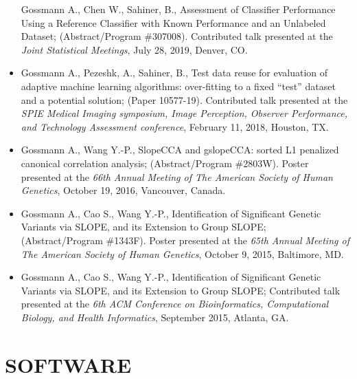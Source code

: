\documentclass[overlapped, line, 10pt]{res} %
\begin{document}
\begin{resume}
\begin{itemize}
    Gossmann A., Chen W., Sahiner, B., Assessment of Classifier Performance Using a Reference Classifier with Known Performance and an Unlabeled Dataset;
    (Abstract/Program \#307008).
    Contributed talk presented at the \textit{Joint Statistical Meetings},
    July 28, 2019, Denver, CO.
  \item
    Gossmann A., Pezeshk, A., Sahiner, B., Test data reuse for evaluation of adaptive machine learning algorithms: over-fitting to a fixed ``test'' dataset and a potential solution;
    (Paper 10577-19).
    Contributed talk presented at the \textit{SPIE Medical Imaging symposium, Image Perception, Observer Performance, and Technology Assessment conference},
    February 11, 2018, Houston, TX.
  \item
    Gossmann A., Wang Y.-P., SlopeCCA and gslopeCCA: sorted L1 penalized canonical correlation analysis;
    (Abstract/Program \#2803W).
    Poster presented at the \textit{66th Annual Meeting of The American Society of Human Genetics},
    October 19, 2016, Vancouver, Canada.
  \item
    Gossmann A., Cao S., Wang Y.-P., Identification of Significant Genetic Variants via SLOPE, and its Extension to Group SLOPE;
    (Abstract/Program \#1343F).
    Poster presented at the \textit{65th Annual Meeting of The American Society of Human Genetics},
    October 9, 2015, Baltimore, MD.
  \item
    Gossmann A., Cao S., Wang Y.-P., Identification of Significant Genetic Variants via SLOPE, and its Extension to Group SLOPE;
    Contributed talk presented at the \textit{6th ACM Conference on Bioinformatics, Computational Biology, and Health Informatics},
    September 2015, Atlanta, GA.
\end{itemize}


\section{SOFTWARE}


\end{resume}
\end{document}

